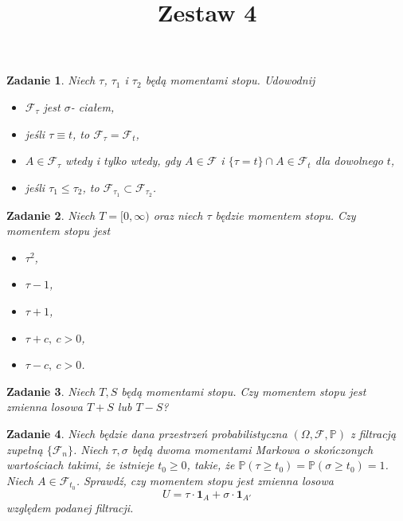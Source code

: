 \documentclass{mwart}
\title{Zestaw 4}
\newtheorem{zd}{Zadanie}
\begin{document}

\maketitle


\begin{zd}
Niech $\tau$, $\tau_1$ i $\tau_2$ będą momentami stopu. Udowodnij
\begin{itemize}
\item $\mathcal{F}_{\tau}$ jest $\sigma$- ciałem,
\item jeśli $\tau \equiv t$, to $\mathcal{F}_{\tau} = \mathcal{F}_t$,
\item $A \in \mathcal{F}_{\tau}$ wtedy i tylko wtedy, gdy $A\in \mathcal{F}$ i $\{\tau = t\} \cap A \in \mathcal{F}_t$ dla dowolnego $t$,
\item jeśli $\tau_1 \leq \tau_2$, to $\mathcal{F}_{\tau_1} \subset \mathcal{F}_{\tau_2}$.
\end{itemize}
\end{zd}

\begin{zd}
Niech $T= [0, \infty)$ oraz niech $\tau$ będzie momentem stopu. Czy momentem stopu jest
\begin{itemize}
\item $\tau^2$,
\item $\tau -1$,
\item $\tau +1$,
\item $\tau + c,\ c>0$,
\item $\tau - c,\ c>0$.
\end{itemize}
\end{zd}

\begin{zd}
		Niech $T, S$ będą momentami stopu. Czy momentem stopu jest zmienna losowa $T + S$ lub $T - S$?
\end{zd}

\begin{zd}
	Niech będzie dana przestrzeń probabilistyczna $(\Omega, \mathcal{F}, \mathbb{P})$ z filtracją zupełną $\{\mathcal{F}_n\}$. Niech $\tau, \sigma$ będą dwoma momentami Markowa o skończonych wartościach takimi, że istnieje $t_0 \geq 0$, takie, że $\mathbb{P}(\tau \geq t_0) = \mathbb{P}(\sigma \geq t_0) = 1$. Niech $A\in \mathcal{F}_{t_0}$. Sprawdź, czy momentem stopu jest zmienna losowa
	\begin{displaymath}
	U = \tau \cdot\pmb{1}_A + \sigma \cdot \pmb{1}_{A'}
	\end{displaymath}
	względem podanej filtracji.
\end{zd}
\end{document}

